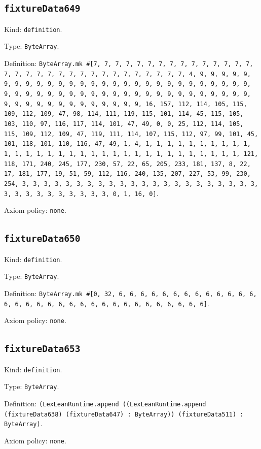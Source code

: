 \documentclass[11pt]{article}
\begin{document}
\subsection*{\texttt{fixtureData649}}
\noindent Kind: \texttt{definition}.\par
\noindent Type: \texttt{ByteArray}.\par
\noindent Definition: \texttt{ByteArray.mk \#[7, 7, 7, 7, 7, 7, 7, 7, 7, 7, 7, 7, 7, 7, 7, 7, 7, 7, 7, 7, 7, 7, 7, 7, 7, 7, 7, 7, 7, 7, 7, 7, 4, 9, 9, 9, 9, 9, 9, 9, 9, 9, 9, 9, 9, 9, 9, 9, 9, 9, 9, 9, 9, 9, 9, 9, 9, 9, 9, 9, 9, 9, 9, 9, 9, 9, 9, 9, 9, 9, 9, 9, 9, 9, 9, 9, 9, 9, 9, 9, 9, 9, 9, 9, 9, 9, 9, 9, 9, 9, 9, 9, 9, 9, 9, 9, 9, 16, 157, 112, 114, 105, 115, 109, 112, 109, 47, 98, 114, 111, 119, 115, 101, 114, 45, 115, 105, 103, 110, 97, 116, 117, 114, 101, 47, 49, 0, 0, 25, 112, 114, 105, 115, 109, 112, 109, 47, 119, 111, 114, 107, 115, 112, 97, 99, 101, 45, 101, 118, 101, 110, 116, 47, 49, 1, 4, 1, 1, 1, 1, 1, 1, 1, 1, 1, 1, 1, 1, 1, 1, 1, 1, 1, 1, 1, 1, 1, 1, 1, 1, 1, 1, 1, 1, 1, 1, 1, 1, 121, 118, 171, 240, 245, 177, 230, 57, 22, 65, 205, 233, 181, 137, 8, 22, 17, 181, 177, 19, 51, 59, 112, 116, 240, 135, 207, 227, 53, 99, 230, 254, 3, 3, 3, 3, 3, 3, 3, 3, 3, 3, 3, 3, 3, 3, 3, 3, 3, 3, 3, 3, 3, 3, 3, 3, 3, 3, 3, 3, 3, 3, 3, 3, 0, 1, 16, 0]}.\par
\noindent Axiom policy: \texttt{none}.\par
\subsection*{\texttt{fixtureData650}}
\noindent Kind: \texttt{definition}.\par
\noindent Type: \texttt{ByteArray}.\par
\noindent Definition: \texttt{ByteArray.mk \#[0, 32, 6, 6, 6, 6, 6, 6, 6, 6, 6, 6, 6, 6, 6, 6, 6, 6, 6, 6, 6, 6, 6, 6, 6, 6, 6, 6, 6, 6, 6, 6, 6, 6]}.\par
\noindent Axiom policy: \texttt{none}.\par
\subsection*{\texttt{fixtureData653}}
\noindent Kind: \texttt{definition}.\par
\noindent Type: \texttt{ByteArray}.\par
\noindent Definition: \texttt{(LexLeanRuntime.append ((LexLeanRuntime.append (fixtureData638) (fixtureData647) : ByteArray)) (fixtureData511) : ByteArray)}.\par
\noindent Axiom policy: \texttt{none}.\par
\end{document}
